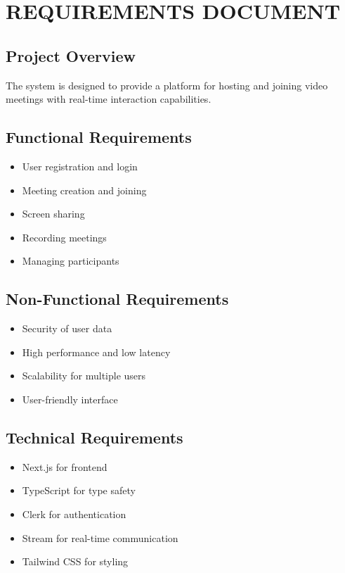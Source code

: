 \chapter{REQUIREMENTS DOCUMENT}

\section{Project Overview}

The system is designed to provide a platform for hosting and joining video meetings with real-time interaction capabilities.

\section{Functional Requirements}

\begin{itemize}
\item User registration and login
\item Meeting creation and joining
\item Screen sharing
\item Recording meetings
\item Managing participants
\end{itemize}

\section{Non-Functional Requirements}

\begin{itemize}
\item Security of user data
\item High performance and low latency
\item Scalability for multiple users
\item User-friendly interface
\end{itemize}

\section{Technical Requirements}

\begin{itemize}
\item Next.js for frontend
\item TypeScript for type safety
\item Clerk for authentication
\item Stream for real-time communication
\item Tailwind CSS for styling
\end{itemize}

